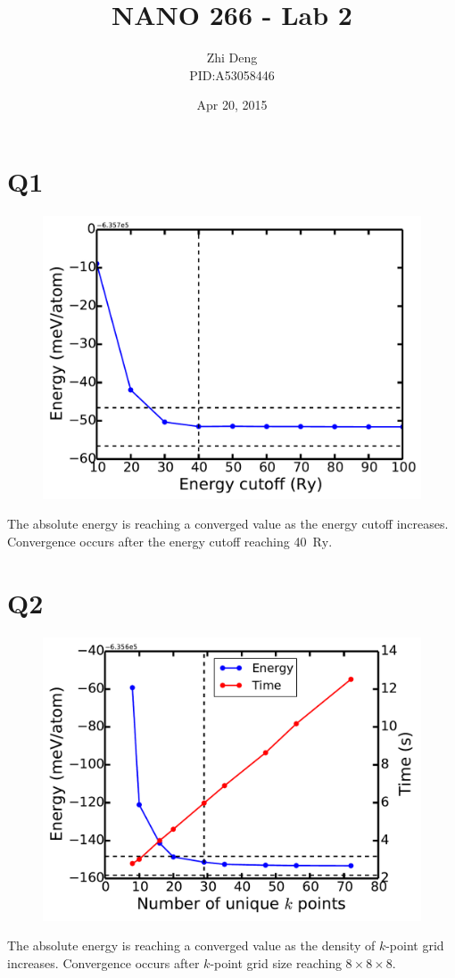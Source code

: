 \documentclass[12pt]{article}
\title{NANO 266 - Lab 2}
\author{Zhi Deng \\ PID:A53058446}
\date{Apr 20, 2015}
\newcommand{\unit}[1]{\ensuremath{\, \mathrm{#1}}}
\begin{document}
\maketitle
\thispagestyle{fancy}

\section*{Q1}

\begin{figure}[h]
\begin{center}
\includegraphics[width=.5\textwidth]{Q1}
\end{center}
\end{figure}

The absolute energy is reaching a converged value as the energy cutoff increases. Convergence occurs after the energy cutoff reaching 40 \unit{Ry}. 

\clearpage

\section*{Q2}

\begin{figure}[h]
\begin{center}
\includegraphics[width=.5\textwidth]{Q2}
\end{center}
\end{figure}

The absolute energy is reaching a converged value as the density of $k$-point grid increases. Convergence occurs after $k$-point grid size reaching $8\times8\times8$. 
\end{document}
